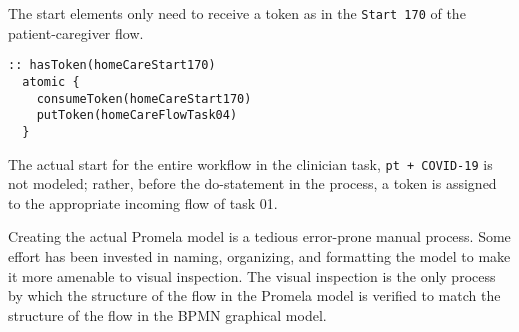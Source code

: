 The start elements only need to receive a token as in the \texttt{Start 170} of the patient-caregiver flow.
%
{\small
\begin{lstlisting}[style=myPromela]
:: hasToken(homeCareStart170)
  atomic {
    consumeToken(homeCareStart170)
    putToken(homeCareFlowTask04)
  }
\end{lstlisting}
}
% 
\noindent The actual start for the entire workflow in the clinician task, \texttt{pt + COVID-19} is not modeled; rather, before the do-statement in the process, a token is assigned to the appropriate incoming flow of task 01.

Creating the actual Promela model is a tedious error-prone manual process. Some effort has been invested in naming, organizing, and formatting the model to make it more amenable to visual inspection. The visual inspection is the only process by which the structure of the flow in the Promela model is verified to match the structure of the flow in the BPMN graphical model.
